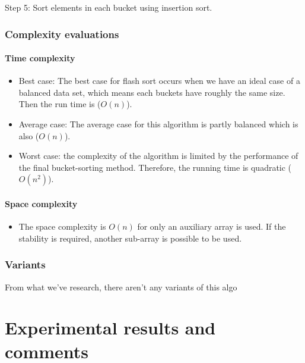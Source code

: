 \documentclass{article}
\newcommand\tab[1][0.5cm]{\hspace*{#1}}
\begin{document}
Step 5: Sort elements in each bucket using insertion sort.

\subsubsection{Complexity evaluations}

\paragraph{\tab Time complexity}

\begin{itemize}
    \item Best case: The best case for flash sort occurs when we have an ideal case of a balanced data set, which means each buckets have roughly the same size. Then the run time is ($O(n)$).
    
    \item Average case: The average case for this algorithm is partly balanced which is also ($O(n)$).
    
    \item Worst case: the complexity of the algorithm is limited by the performance of the final bucket-sorting method. Therefore, the running time is quadratic ($O(n^2)$).
\end{itemize}

\paragraph{\tab Space complexity}

\begin{itemize}
    \item The space complexity is $O(n)$ for only an auxiliary array is used. If the stability is required, another sub-array is possible to be used.
\end{itemize}

\subsubsection{Variants}

\tab From what we've research, there aren't any variants of this algo

\pagebreak



\section{Experimental results and comments}
\end{document}
